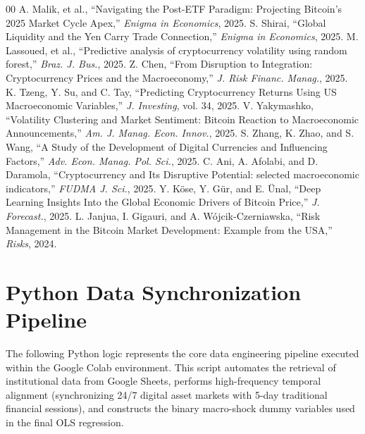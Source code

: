 \documentclass[10pt, conference, compsocconf]{IEEEtran}
\begin{document}
\begin{thebibliography}{00}
 A. Malik, et al., ``Navigating the Post-ETF Paradigm: Projecting Bitcoin's 2025 Market Cycle Apex,'' \textit{Enigma in Economics}, 2025.
 S. Shirai, ``Global Liquidity and the Yen Carry Trade Connection,'' \textit{Enigma in Economics}, 2025.
 M. Lassoued, et al., ``Predictive analysis of cryptocurrency volatility using random forest,'' \textit{Braz. J. Bus.}, 2025.
 Z. Chen, ``From Disruption to Integration: Cryptocurrency Prices and the Macroeconomy,'' \textit{J. Risk Financ. Manag.}, 2025.
 K. Tzeng, Y. Su, and C. Tay, ``Predicting Cryptocurrency Returns Using US Macroeconomic Variables,'' \textit{J. Investing}, vol. 34, 2025.
 V. Yakymashko, ``Volatility Clustering and Market Sentiment: Bitcoin Reaction to Macroeconomic Announcements,'' \textit{Am. J. Manag. Econ. Innov.}, 2025.
 S. Zhang, K. Zhao, and S. Wang, ``A Study of the Development of Digital Currencies and Influencing Factors,'' \textit{Adv. Econ. Manag. Pol. Sci.}, 2025.
 C. Ani, A. Afolabi, and D. Daramola, ``Cryptocurrency and Its Disruptive Potential: selected macroeconomic indicators,'' \textit{FUDMA J. Sci.}, 2025.
 Y. Köse, Y. Gür, and E. Ünal, ``Deep Learning Insights Into the Global Economic Drivers of Bitcoin Price,'' \textit{J. Forecast.}, 2025.
 L. Janjua, I. Gigauri, and A. Wójcik-Czerniawska, ``Risk Management in the Bitcoin Market Development: Example from the USA,'' \textit{Risks}, 2024.
\end{thebibliography}

\appendix

\section{Python Data Synchronization Pipeline}

The following Python logic represents the core data engineering pipeline executed within the Google Colab environment. This script automates the retrieval of institutional data from Google Sheets, performs high-frequency temporal alignment (synchronizing 24/7 digital asset markets with 5-day traditional financial sessions), and constructs the binary macro-shock dummy variables used in the final OLS regression.
\end{document}
